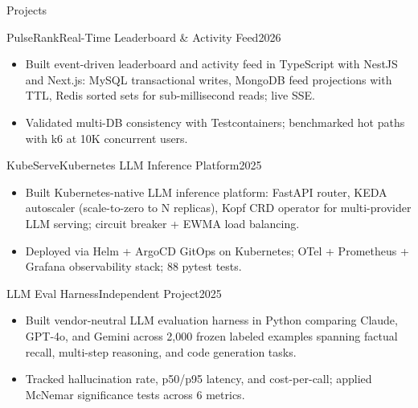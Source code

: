 \documentclass[]{mcdowellcv}
\begin{document}
\begin{cvsection}{Projects}
  \begin{cvsubsection}{PulseRank}{Real-Time Leaderboard \& Activity Feed}{2026}
    \begin{itemize}
      \item Built event-driven leaderboard and activity feed in TypeScript with NestJS and Next.js: MySQL transactional writes, MongoDB feed projections with TTL, Redis sorted sets for sub-millisecond reads; live SSE.
      \item Validated multi-DB consistency with Testcontainers; benchmarked hot paths with k6 at 10K concurrent users.
    \end{itemize}
    \vspace{-1.5pt}
  \end{cvsubsection}

  \begin{cvsubsection}{KubeServe}{Kubernetes LLM Inference Platform}{2025}
    \begin{itemize}
      \item Built Kubernetes-native LLM inference platform: FastAPI router, KEDA autoscaler (scale-to-zero to N replicas), Kopf CRD operator for multi-provider LLM serving; circuit breaker + EWMA load balancing.
      \item Deployed via Helm + ArgoCD GitOps on Kubernetes; OTel + Prometheus + Grafana observability stack; 88 pytest tests.
    \end{itemize}
    \vspace{-1.5pt}
  \end{cvsubsection}

  \begin{cvsubsection}{LLM Eval Harness}{Independent Project}{2025}
    \begin{itemize}
      \item Built vendor-neutral LLM evaluation harness in Python comparing Claude, GPT-4o, and Gemini across 2,000 frozen labeled examples spanning factual recall, multi-step reasoning, and code generation tasks.
      \item Tracked hallucination rate, p50/p95 latency, and cost-per-call; applied McNemar significance tests across 6 metrics.
    \end{itemize}
    \vspace{-1.5pt}
  \end{cvsubsection}
\end{cvsection}
\end{document}
